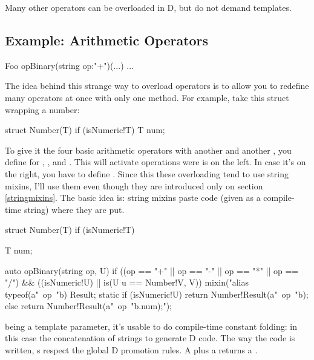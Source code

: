 Many other operators can be overloaded in D, but do not demand templates.

\subsection{Example: Arithmetic Operators}


\begin{dcode}
Foo opBinary(string op:"+")(...) { ... }
\end{dcode}

The idea behind this strange way to overload operators is to allow you to redefine many operators at once with only one method. For example, take this struct wrapping a number:

\begin{dcode}
struct Number(T) if (isNumeric!T)
{
    T num;
}
\end{dcode}

To give it the four basic arithmetic operators with another  and another , you define  for \DD{+}, \DD{-}, \DD{*} and \DD{/}. This will activate operations were  is on the left. In case it's on the right, you have to define . Since this these overloading tend to use string mixins, I'll use them even though they are introduced only on section \ref{stringmixins}. The basic idea is: string mixins paste code (given as a compile-time string) where they are put.

\begin{dcode}
struct Number(T) if (isNumeric!T)
{
    T num;

    auto opBinary(string op, U) 
         if ((op == "+" || op == "-" || op == "*" || op == "/") 
         && ((isNumeric!U) || is(U u == Number!V, V))
    {
 mixin("alias typeof(a"~op~"b) Result;     
        static if (isNumeric!U)
            return Number!Result(a"~op~"b);
        else
            return Number!Result(a"~op~"b.num);");
    }    
}
\end{dcode}

 being a template parameter, it's usable to do compile-time constant folding: in this case the concatenation of strings to generate D code. The way the code is written, s respect the global D promotion rules. A  plus a  returns a .

